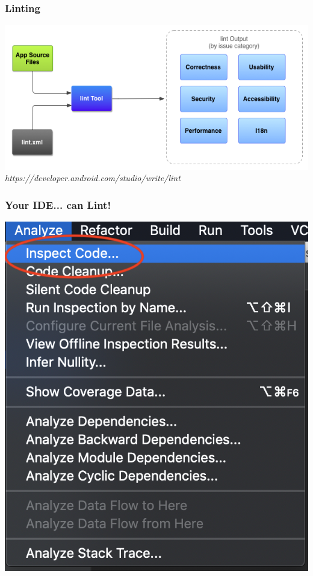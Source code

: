 \documentclass[10pt]{beamer}
\begin{document}
\begin{frame}
    \frametitle{Linting}
    \center\includegraphics[scale=0.5]{3rd_party/lint}
    \tiny\emph{https://developer.android.com/studio/write/lint}
\end{frame}

\begin{frame}
    \frametitle{Your IDE... can Lint!}
    \center\includegraphics[scale=0.5]{lint_step1}
\end{frame}
\end{document}
